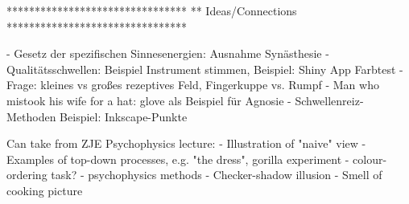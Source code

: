 ********************************
** Ideas/Connections
********************************

- Gesetz der spezifischen Sinnesenergien: Ausnahme Synästhesie
- Qualitätsschwellen: Beispiel Instrument stimmen, Beispiel: Shiny App Farbtest
- Frage: kleines vs großes rezeptives Feld, Fingerkuppe vs. Rumpf 
- Man who mistook his wife for a hat: glove als Beispiel für Agnosie
- Schwellenreiz-Methoden Beispiel: Inkscape-Punkte


Can take from ZJE Psychophysics lecture:
- Illustration of "naive"  view
- Examples of top-down processes, e.g. "the dress", gorilla experiment
- colour-ordering task? 
- psychophysics methods 
- Checker-shadow illusion
- Smell of cooking picture
